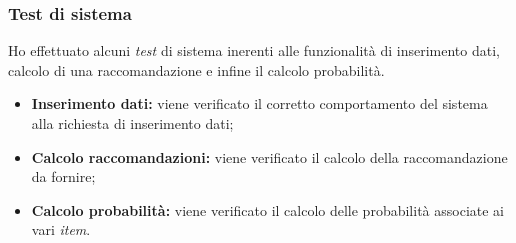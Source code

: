\subsubsection{Test di sistema}
Ho effettuato alcuni \emph{test} di sistema inerenti alle funzionalità di inserimento dati, calcolo di una raccomandazione e infine il calcolo probabilità.
\begin{itemize}
\item \textbf{Inserimento dati:} viene verificato il corretto comportamento del sistema alla richiesta di inserimento dati;
\item \textbf{Calcolo raccomandazioni:} viene verificato il calcolo della raccomandazione da fornire;
\item \textbf{Calcolo probabilità:} viene verificato il calcolo delle probabilità associate ai vari \emph{item}.
\end{itemize}




\newpage
